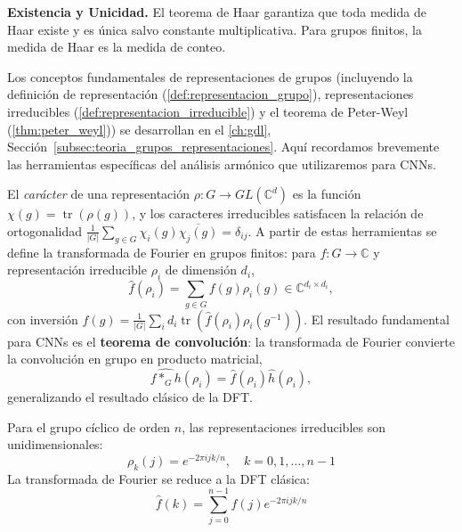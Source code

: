 \textbf{Existencia y Unicidad.} El teorema de Haar garantiza que toda medida de Haar existe y es única salvo constante multiplicativa. Para grupos finitos, la medida de Haar es la medida de conteo.

Los conceptos fundamentales de representaciones de grupos (incluyendo la definición de representación (\autoref{def:representacion_grupo}), representaciones irreducibles (\autoref{def:representacion_irreducible}) y el teorema de Peter-Weyl (\autoref{thm:peter_weyl})) se desarrollan en el \autoref{ch:gdl}, Sección~\ref{subsec:teoria_grupos_representaciones}. Aquí recordamos brevemente las herramientas específicas del análisis armónico que utilizaremos para CNNs.

El \textit{carácter} de una representación $\rho: G \to GL(\mathbb{C}^d)$ es la función $\chi(g) = \operatorname{tr}(\rho(g))$, y los caracteres irreducibles satisfacen la relación de ortogonalidad $\frac{1}{|G|} \sum_{g \in G} \chi_i(g) \overline{\chi_j(g)} = \delta_{ij}$. A partir de estas herramientas se define la transformada de Fourier en grupos finitos: para $f: G \to \mathbb{C}$ y representación irreducible $\rho_i$ de dimensión $d_i$,
\begin{equation}\label{eq:fourier_grupo_finito}
\hat{f}(\rho_i) = \sum_{g\in G} f(g)\rho_i(g) \in \mathbb{C}^{d_i \times d_i},
\end{equation}
con inversión $f(g) = \frac{1}{|G|} \sum_i d_i \operatorname{tr}(\hat{f}(\rho_i) \rho_i(g^{-1}))$. El resultado fundamental para CNNs es el \textbf{teorema de convolución}: la transformada de Fourier convierte la convolución en grupo en producto matricial,
\begin{equation}\label{eq:convolucion_fourier_grupos}
\widehat{f *_G h}(\rho_i) = \hat{f}(\rho_i) \hat{h}(\rho_i),
\end{equation}
generalizando el resultado clásico de la DFT.

\begin{example}\label{ex:grupo_ciclico_fourier}
Para el grupo cíclico de orden $n$, las representaciones irreducibles son unidimensionales:
\begin{equation}
\rho_k(j) = e^{-2\pi i jk/n}, \quad k = 0, 1, \ldots, n-1
\end{equation}
La transformada de Fourier se reduce a la DFT clásica:
\begin{equation}
\hat{f}(k) = \sum_{j=0}^{n-1} f(j) e^{-2\pi i jk/n}
\end{equation}
\end{example}


